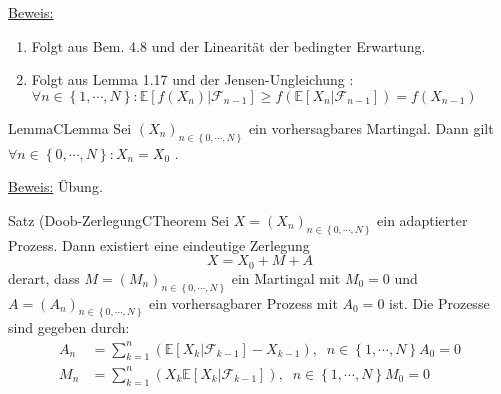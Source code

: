 \underline{Beweis:}
\begin{enumerate}[label=\alph*)]
	\item Folgt aus Bem. 4.8 und der Linearität der bedingter Erwartung. 
	\item Folgt aus Lemma 1.17 und der Jensen-Ungleichung : $ \forall n \in \left\{ 1 , \cdots, N \right\}: \mathbb{E} \left[ f (X_n) | \mathcal{F}_{n-1} \right] \geq f \left( \mathbb{E} \left[ X_n | \mathcal{F}_{n-1} \right] \right) = f \left( X_{n-1} \right)  $ 
\end{enumerate}

\begin{ibox}[4.10]{Lemma}{CLemma}
    Sei $ \left( X_n \right)_{n \in \left\{ 0 , \cdots, N \right\}} $ ein vorhersagbares Martingal. Dann gilt $ \forall n \in \left\{ 0 , \cdots, N \right\}: X_n = X_0 $ .
\end{ibox}

\underline{Beweis:} Übung.

\begin{ibox}[4.11]{Satz (Doob-Zerlegung}{CTheorem}
   Sei  $ X =  \left( X_n \right)_{n \in \left\{ 0 , \cdots, N \right\}}  $ ein adaptierter Prozess. Dann existiert eine eindeutige Zerlegung 
	 $$ X = X_0 + M + A $$
	derart, dass  $  M =  \left( M_n \right)_{n \in \left\{ 0 , \cdots, N \right\}}$ ein Martingal mit $ M_0 = 0 $ und $ A =  \left( A_n \right)_{n \in \left\{ 0 , \cdots, N \right\}} $ ein vorhersagbarer Prozess mit $ A_0 = 0 $ ist. Die Prozesse sind gegeben durch:
	\begin{align*}
		A_n &= \sum_{k=1}^{n} \left( \mathbb{E} \left[ X_k | \mathcal{F}_{k-1} \right] - X_{k-1} \right), \; \; n \in \left\{ 1 , \cdots, N \right\} A_0 = 0 \\ 
		M_n &= \sum_{k=1}^{n} \left( X_k \mathbb{E} \left[ X_k | \mathcal{F}_{k-1} \right] \right), \; \; n \in \left\{ 1 , \cdots, N \right\} M_0 = 0 \\ 
	\end{align*}
\end{ibox}

